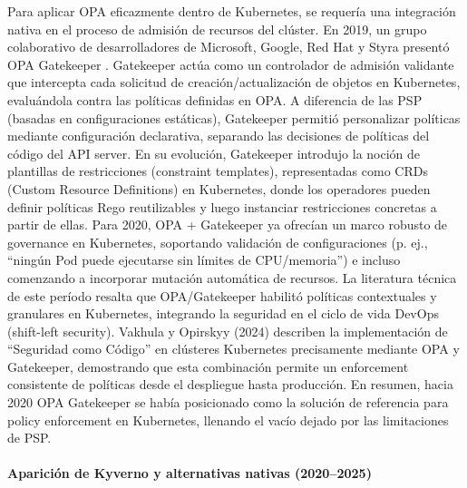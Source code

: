 \documentclass[12pt,twoside,titlepage]{report}
\begin{document}
Para aplicar OPA eficazmente dentro de Kubernetes, se requería una integración nativa en el proceso de admisión de recursos del clúster. En 2019, un grupo colaborativo de desarrolladores de Microsoft, Google, Red Hat y Styra presentó OPA Gatekeeper \cite{zhang2019gatekeeper}. Gatekeeper actúa como un controlador de admisión validante que intercepta cada solicitud de creación/actualización de objetos en Kubernetes, evaluándola contra las políticas definidas en OPA. A diferencia de las PSP (basadas en configuraciones estáticas), Gatekeeper permitió personalizar políticas mediante configuración declarativa, separando las decisiones de políticas del código del API server. En su evolución, Gatekeeper introdujo la noción de plantillas de restricciones (constraint templates), representadas como CRDs (Custom Resource Definitions) en Kubernetes, donde los operadores pueden definir políticas Rego reutilizables y luego instanciar restricciones concretas a partir de ellas. Para 2020, OPA + Gatekeeper ya ofrecían un marco robusto de governance en Kubernetes, soportando validación de configuraciones (p. ej., “ningún Pod puede ejecutarse sin límites de CPU/memoria”) e incluso comenzando a incorporar mutación automática de recursos. La literatura técnica de este período resalta que OPA/Gatekeeper habilitó políticas contextuales y granulares en Kubernetes, integrando la seguridad en el ciclo de vida DevOps (shift-left security). Vakhula y Opirskyy (2024) \cite{vakhula2024security} describen la implementación de “Seguridad como Código” en clústeres Kubernetes precisamente mediante OPA y Gatekeeper, demostrando que esta combinación permite un enforcement consistente de políticas desde el despliegue hasta producción. En resumen, hacia 2020 OPA Gatekeeper se había posicionado como la solución de referencia para policy enforcement en Kubernetes, llenando el vacío dejado por las limitaciones de PSP.


\paragraph{Aparición de Kyverno y alternativas nativas (2020–2025) \\ \\}
\end{document}
